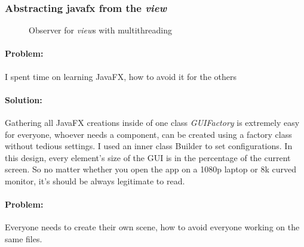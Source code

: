 \documentclass[a4paper,12pt]{report}
\begin{document}
\subsubsection*{Abstracting javafx from the \textit{view}}
\begin{figure}[H]
    \centering{}
    \caption{Observer for \textit{view}s with multithreading}
    \label{img:Observer}
    \end{figure}

    \paragraph{Problem:} I spent time on learning JavaFX, how to avoid it for the others

    \paragraph*{Solution:} Gathering all JavaFX creations inside of one class \textit{GUIFactory} is extremely easy for everyone, whoever needs a component, can be created using a factory class without tedious settings. I used an inner class Builder to set configurations. In this design, every element's size of the GUI is in the percentage of the current screen. So no matter whether you open the app on a 1080p laptop or 8k curved monitor, it's should be always legitimate to read.


    \paragraph{Problem:} Everyone needs to create their own scene, how to avoid everyone working on the same files.
\end{document}
